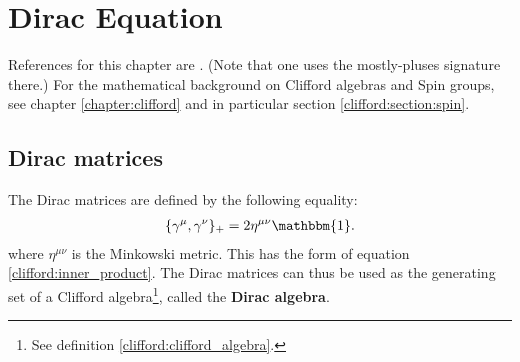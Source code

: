 \chapter{Dirac Equation}

    References for this chapter are \cite{supergravity}. (Note that one uses the mostly-pluses signature there.) For the mathematical background on Clifford algebras and Spin groups, see chapter \ref{chapter:clifford} and in particular section \ref{clifford:section:spin}.

\section{Dirac matrices}

    \begin{property}
        The Dirac matrices are defined by the following equality:
        \begin{gather}
            \label{dirac:clifford_relation}
            \{\gamma^\mu,\gamma^\nu\}_+ = 2\eta^{\mu\nu}\mathbbm{1}.
        \end{gather}
        where $\eta^{\mu\nu}$ is the Minkowski metric. This has the form of equation \ref{clifford:inner_product}. The Dirac matrices can thus be used as the generating set of a Clifford algebra\footnote{See definition \ref{clifford:clifford_algebra}.}, called the \textbf{Dirac algebra}.
    \end{property}

